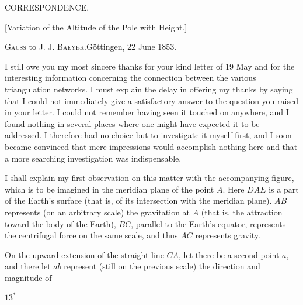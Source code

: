 \clearpage
\begin{center}
{\Large CORRESPONDENCE.}\par\vspace{10mm}
{\large [Variation of the Altitude of the Pole with Height.]}\par\vspace{8mm}
\textsc{Gauss} to \textsc{J. J. Baeyer}.\quad Göttingen, 22 June 1853.
\end{center}
I still owe you my most sincere thanks for your kind letter of 19 May and for the interesting information concerning the connection between the various triangulation networks. I must explain the delay in offering my thanks by saying that I could not immediately give a satisfactory answer to the question you raised in your letter. I could not remember having seen it touched on anywhere, and I found nothing in several places where one might have expected it to be addressed. I therefore had no choice but to investigate it myself first, and I soon became convinced that mere impressions would accomplish nothing here and that a more searching investigation was indispensable.

I shall explain my first observation on this matter with the accompanying figure, which is to be imagined in the meridian plane of the point $A$. Here $DAE$ is a part of the Earth's surface (that is, of its intersection with the meridian plane). $AB$ represents (on an arbitrary scale) the gravitation at $A$ (that is, the attraction toward the body of the Earth), $BC$, parallel to the Earth's equator, represents the centrifugal force on the same scale, and thus $AC$ represents gravity.

On the upward extension of the straight line $CA$, let there be a second point $a$, and there let $ab$ represent (still on the previous scale) the direction and magnitude of
\par\noindent\hfill $13^{*}$\par

